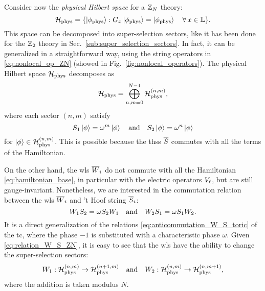 Consider now the \emph{physical Hilbert space} for a $\mathbb{Z}_N$ theory:
\begin{equation}
    \mathcal{H}_{\text{phys}} = \{ \ket{\phi_{\text{phys}}} : G_x \ket{\phi_{\text{phys}}} = \ket{\phi_{\text{phys}}} \quad \forall \, x \in \mathbb{L} \}.
    \label{eq:decomposizione_Hphys}
\end{equation}
This space can be decomposed into super-selection sectors, like it has been done for the $\mathbb{Z}_2$ theory in Sec.~\ref{sub:super_selection_sectors}.
In fact, it can be generalized in a straightforward way, using the string operators in \eqref{eq:nonlocal_op_ZN} (showed in Fig.~\ref{fig:nonlocal_operators}).
The physical Hilbert space $\mathcal{H}_{\text{phys}}$ decomposes as
\begin{equation}
    \mathcal{H}_{\text{phys}} = \bigoplus_{n,m=0}^{N-1} \mathcal{H}_{\text{phys}}^{(n,m)},
\end{equation}
where each sector $(n,m)$ satisfy
\begin{equation}
    S_1 \ket{\phi} = \omega^{m} \ket{\phi}
    \qand
    S_2 \ket{\phi} = \omega^{n} \ket{\phi}
\end{equation}
for $\ket{\phi} \in \mathcal{H}_{\text{phys}}^{(n,m)}$.
This is possible because the \ac{ths}s $\overline{S}$ commutes with all the terms of the Hamiltonian.

On the other hand, the \ac{wl}s $\overline{W}_i$ do not commute with all the Hamiltonian \eqref{eq:hamiltonian_base}, in particular with the electric operators $V_{\ell}$, but are still gauge-invariant.
Nonetheless, we are interested in the commutation relation between the \ac{wl}s $\overline{W}_i$ and 't Hoof string $\overline{S}_i$:
\begin{equation}
    W_1 S_2 = \omega S_2 W_1
    \qand
    W_2 S_1 = \omega S_1 W_2.
    \label{eq:relation_W_S_ZN}
\end{equation}
It is a direct generalization of the relations \eqref{eq:anticommutation_W_S_toric} of the \ac{tc}, where the phase $-1$ is substituted with a characteristic phase $\omega$.
Given \eqref{eq:relation_W_S_ZN}, it is easy to see that the \ac{wl}s have the ability to change the super-selection sectors:
\begin{equation}
    W_1 : \Hphys^{(n,m)} \to \Hphys^{(n+1,m)}
    \qand
    W_2 : \Hphys^{(n,m)} \to \Hphys^{(n,m+1)},
    \label{eq:azione_wilson_loop}
\end{equation}
where the addition is taken modulus $N$.


